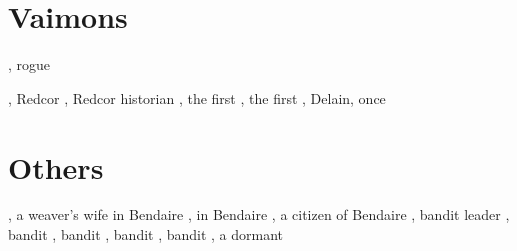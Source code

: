 \section{Vaimons}
\begin{dramatispersonae}
  \dramitem[Carzain]{\CarzainDeracilleShireyo}
    {\human}{\male}, 
    rogue 
    \begin{subdramatispersonae}
    \end{subdramatispersonae}
    {\human}{\female}, 
    Redcor
    {\human}{\female}, Redcor historian
  , the first 
  , 
    the first 
  \dramdead[Vizicar]{\VizicarDurasRespina}{\human}{\male}, Delain, once \caliph
\end{dramatispersonae}



\section{Others}
\begin{dramatispersonae}
  , a weaver's wife in Bendaire
  , in Bendaire
  , a citizen of Bendaire
  , bandit leader
  , bandit 
  , bandit 
  , bandit 
  , bandit 
  \dramitem[Shiaraid]{\Shiaraid}{\malach}{\female}, a dormant 
\end{dramatispersonae}







